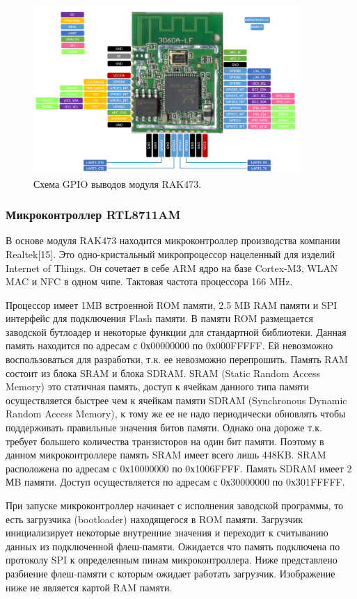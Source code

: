 \begin{figure}[h!]
    \centering
    \includegraphics[width=0.9\textwidth]{rak473_pinout.png}
    \caption{Схема GPIO выводов модуля RAK473.}
\end{figure}

\subsubsection{ Микроконтроллер RTL8711AM}
В основе модуля RAK473 находится микроконтроллер производства компании Realtek[15]. Это одно-кристальный микропроцессор нацеленный для изделий Internet of Things. Он сочетает в себе ARM ядро на базе Cortex-M3, WLAN MAC и NFC в одном чипе. Тактовая частота процессора 166 MHz. 

Процессор имеет 1MB встроенной ROM памяти, 2.5 MB RAM памяти и SPI интерфейс для подключения Flash памяти.  В памяти ROM размещается заводской бутлоадер и некоторые функции для стандартной библиотеки. Данная память находится по адресам с 0х00000000 по 0х000FFFFF. Ей невозможно воспользоваться для разработки, т.к. ее невозможно перепрошить. Память RAM состоит из блока SRAM и блока SDRAM. SRAM (Static Random Access Memory) это статичная память, доступ к ячейкам данного типа памяти осуществляется быстрее чем к ячейкам памяти SDRAM (Synchronous Dynamic Random Access Memory), к тому же ее не надо периодически обновлять чтобы поддерживать правильные значения битов памяти. Однако она дороже т.к. требует большего количества транзисторов на один бит памяти. Поэтому в данном микроконтроллере память SRAM имеет всего лишь 448KB. SRAM расположена по адресам с 0х10000000 по 0х1006FFFF. Память SDRAM имеет 2 МB памяти. Доступ осуществляется по адресам с 0х30000000 по 0х301FFFFF.

При запуске микроконтроллер начинает с исполнения заводской программы, то есть загрузчика (bootloader) находящегося в ROM памяти. Загрузчик инициализирует некоторые внутренние значения и переходит к считыванию данных из подключенной флеш-памяти. Ожидается что память подключена по протоколу SPI к определенным пинам микроконтроллера. 
Ниже представлено разбиение флеш-памяти с которым ожидает работать загрузчик. Изображение ниже не является картой RAM памяти. 

